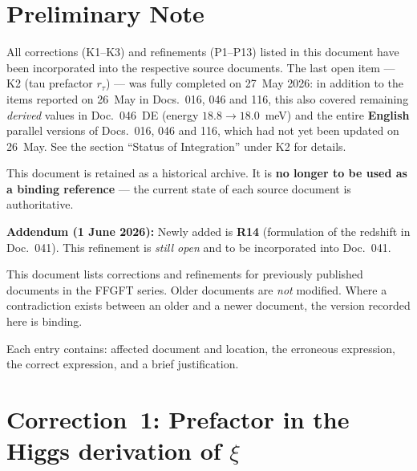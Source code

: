 
\section*{Preliminary Note}

\begin{tcolorbox}[colback=green!5!white, colframe=green!50!black, title={Status: C1--C3, R1--R13 incorporated --- R14 open (as of 1 June 2026)}]
All corrections (K1–K3) and refinements (P1–P13) listed in this
document have been incorporated into the respective source documents.
The last open item --- K2 (tau prefactor $r_\tau$) --- was fully
completed on 27~May 2026: in addition to the items reported on 26~May
in Docs.~016, 046 and 116, this also covered remaining \emph{derived}
values in Doc.~046~DE (energy $18.8 \to 18.0$~meV) and the entire
\textbf{English} parallel versions of Docs.~016, 046 and 116, which had
not yet been updated on 26~May. See the section ``Status of Integration''
under K2 for details.

This document is retained as a historical archive.
It is \textbf{no longer to be used as a binding reference} —
the current state of each source document is authoritative.

\medskip

\textbf{Addendum (1 June 2026):} Newly added is \textbf{R14} (formulation
of the redshift in Doc.~041). This refinement is \emph{still open} and to
be incorporated into Doc.~041.
\end{tcolorbox}

\bigskip

This document lists corrections and refinements for previously
published documents in the FFGFT series. Older documents are
\emph{not} modified. Where a contradiction exists between an older and
a newer document, the version recorded here is binding.

Each entry contains: affected document and location, the erroneous
expression, the correct expression, and a brief justification.

\section{\texorpdfstring{Correction~1: Prefactor in the Higgs derivation of $\xi$}{Correction 1: Prefactor in the Higgs derivation of xi}}

